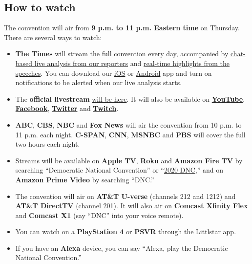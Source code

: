 \hypertarget{how-to-watch}{%
\subsection{How to watch}\label{how-to-watch}}

The convention will air from \textbf{9 p.m. to 11 p.m. Eastern time} on
Thursday. There are several ways to watch:

\begin{itemize}
\tightlist
\item
  \textbf{The Times} will stream the full convention every day,
  accompanied by
  \href{https://www.nytimes3xbfgragh.onion/interactive/2020/08/20/us/politics/live-dnc-stream-analysis.html}{chat-based
  live analysis from our reporters} and
  \href{https://www.nytimes3xbfgragh.onion/live/2020/08/20/us/dnc-convention-election}{real-time
  highlights from the speeches}. You can download our
  \href{https://slack-redir.net/link?url=https\%3A\%2F\%2Fsearch.itunes.apple.com\%2FWebObjects\%2FMZContentLink.woa\%2Fwa\%2Flink\%3Fmt\%3D8\%26path\%3Dapps\%252fnytimes}{iOS}
  or
  \href{https://slack-redir.net/link?url=https\%3A\%2F\%2Fhelp.nytimes3xbfgragh.onion\%2Fhc\%2Fen-us\%2Farticles\%2F115015970768-Android}{Android}
  app and turn on notifications to be alerted when our live analysis
  starts.
\end{itemize}

\begin{itemize}
\item
  The \textbf{official livestream}
  \href{https://www.demconvention.com/watch-the-convention/}{will be
  here}. It will also be available on
  \textbf{\href{http://www.youtube.com/demconvention}{YouTube}},
  \textbf{\href{http://www.facebookcorewwwi.onion/demconvention}{Facebook}},
  \textbf{\href{http://www.twitter.com/demconvention}{Twitter}} and
  \textbf{\href{https://www.twitch.tv/demconvention}{Twitch}}.
\item
  \textbf{ABC}, \textbf{CBS}, \textbf{NBC} and \textbf{Fox News} will
  air the convention from 10 p.m. to 11 p.m. each night.
  \textbf{C-SPAN}, \textbf{CNN}, \textbf{MSNBC} and \textbf{PBS} will
  cover the full two hours each night.
\item
  Streams will be available on \textbf{Apple TV}, \textbf{Roku} and
  \textbf{Amazon Fire TV} by searching ``Democratic National
  Convention'' or
  ``\href{https://www.nytimes3xbfgragh.onion/article/the-dnc-explained.html}{2020
  DNC},'' and on \textbf{Amazon Prime Video} by searching ``DNC.''
\item
  The convention will air on \textbf{AT\&T U-verse} (channels 212 and
  1212) and \textbf{AT\&T DirectTV} (channel 201). It will also air on
  \textbf{Comcast Xfinity Flex} and \textbf{Comcast X1} (say ``DNC''
  into your voice remote).
\item
  You can watch on a \textbf{PlayStation 4} or \textbf{PSVR} through the
  Littlstar app.
\item
  If you have an \textbf{Alexa} device, you can say ``Alexa, play the
  Democratic National Convention.''
\end{itemize}

